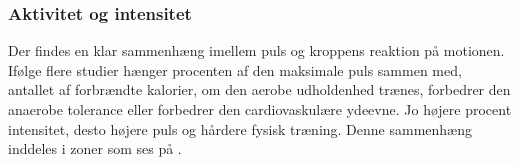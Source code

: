 \subsubsection{Aktivitet og intensitet}\label{subsub:ak_int}
Der findes en klar sammenhæng imellem puls og kroppens reaktion på motionen. Ifølge flere studier hænger procenten af den maksimale puls sammen med, antallet af forbrændte kalorier, om den aerobe udholdenhed trænes, forbedrer den anaerobe tolerance eller forbedrer den cardiovaskulære ydeevne. Jo højere procent intensitet, desto højere puls og hårdere fysisk træning. Denne sammenhæng inddeles i zoner som ses på . \citep{Leyland2007,Heartratejournal2015}
